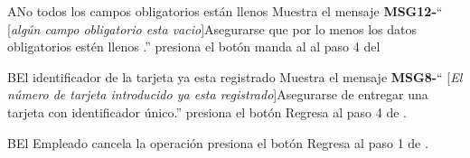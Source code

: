 \begin{UCtrayectoriaA}{A}{No todos los campos obligatorios están llenos}
			\UCpaso Muestra el mensaje {\bf MSG12-}`` [{\em algún campo obligatorio esta vacio}]Asegurarse que por lo menos los datos obligatorios estén llenos .''
			\UCpaso [\UCactor] presiona el botón 
			\UCpaso manda al \UCactor al paso 4 del 
		\end{UCtrayectoriaA}	
\begin{UCtrayectoriaA}{B}{El identificador de la tarjeta ya esta registrado}
			\UCpaso Muestra el mensaje {\bf MSG8-}`` [{\em El número de tarjeta introducido ya esta registrado}]Asegurarse de entregar una tarjeta con identificador único.''
			\UCpaso [\UCactor] presiona el botón 
			\UCpaso Regresa al paso 4 de .
		\end{UCtrayectoriaA}
		
\begin{UCtrayectoriaA}{B}{El Empleado cancela la operación }
			\UCpaso [\UCactor] presiona el botón 
			\UCpaso Regresa al paso 1 de .
		\end{UCtrayectoriaA}							
						



